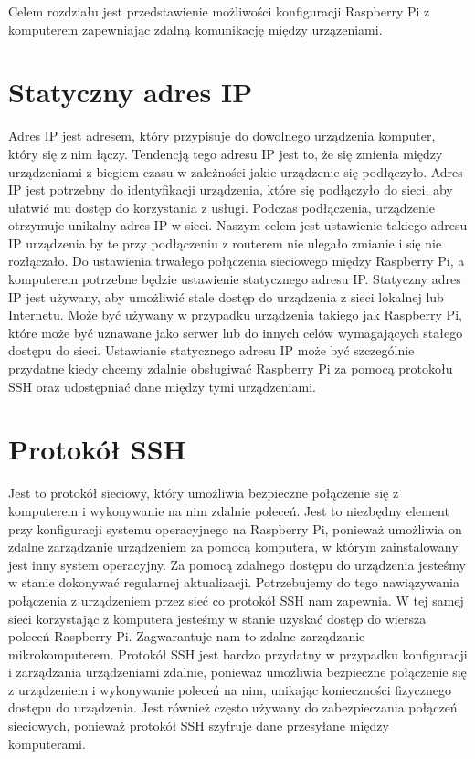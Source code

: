 Celem rozdziału jest przedstawienie możliwości konfiguracji Raspberry Pi z komputerem zapewniając zdalną komunikację między urzązeniami.
\section{Statyczny adres IP}
Adres IP jest adresem, który przypisuje do dowolnego urządzenia komputer, który się z nim łączy. Tendencją tego adresu IP jest to, że się zmienia między urządzeniami z biegiem czasu w zależności jakie urządzenie się podłączyło. Adres IP jest potrzebny do identyfikacji urządzenia, które się podłączyło do sieci, aby ułatwić mu dostęp do korzystania z usługi. Podczas podłączenia, urządzenie otrzymuje unikalny adres IP w sieci. Naszym celem jest ustawienie takiego adresu IP urządzenia by te przy podłączeniu z routerem nie ulegało zmianie i się nie rozłączało. Do ustawienia trwałego połączenia sieciowego między Raspberry Pi, a komputerem potrzebne będzie ustawienie statycznego adresu IP. Statyczny adres IP jest używany, aby umożliwić stale dostęp do urządzenia z sieci lokalnej lub Internetu. Może być używany w przypadku urządzenia takiego jak Raspberry Pi, które może być uznawane jako serwer lub do innych celów wymagających stałego dostępu do sieci. Ustawianie statycznego adresu IP może być szczególnie przydatne kiedy chcemy zdalnie obsługiwać Raspberry Pi za pomocą protokołu SSH oraz udostępniać dane między tymi urządzeniami. 
\section{Protokół SSH}
Jest to protokół sieciowy, który umożliwia bezpieczne połączenie się z komputerem i wykonywanie na nim zdalnie poleceń. Jest to niezbędny element przy konfiguracji systemu operacyjnego na Raspberry Pi, ponieważ umożliwia on zdalne zarządzanie urządzeniem za pomocą komputera, w którym zainstalowany jest inny system operacyjny. Za pomocą zdalnego dostępu do urządzenia jesteśmy w stanie dokonywać regularnej aktualizacji. Potrzebujemy do tego nawiązywania połączenia z urządzeniem przez sieć co protokół SSH nam zapewnia. W tej samej sieci korzystając z komputera jesteśmy w stanie uzyskać dostęp do wiersza poleceń Raspberry Pi. Zagwarantuje nam to zdalne zarządzanie mikrokomputerem. Protokół SSH jest bardzo przydatny w przypadku konfiguracji i zarządzania urządzeniami zdalnie, ponieważ umożliwia bezpieczne połączenie się z urządzeniem i wykonywanie poleceń na nim, unikając konieczności fizycznego dostępu do urządzenia. Jest również często używany do zabezpieczania połączeń sieciowych, ponieważ protokół SSH szyfruje dane przesyłane między komputerami.